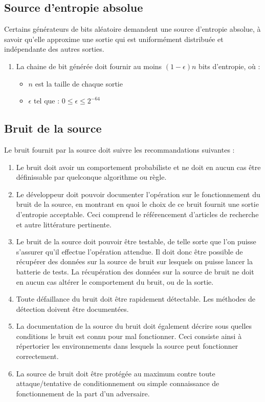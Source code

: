 \subsection{Source d'entropie absolue}
Certains générateurs de bits aléatoire demandent une source d'entropie absolue, à savoir qu'elle approxime une sortie qui est uniformément distribuée et indépendante des autres sorties. 
\begin{enumerate}
\item La chaine de bit générée doit fournir au moins $(1-\epsilon)n$ bits d'entropie, où : 
	\begin{itemize}
	\item $n$ est la taille de chaque sortie
	\item $\epsilon$ tel que : $0\leqslant \epsilon \leqslant 2^{-64}$
	\end{itemize}
\end{enumerate}

\subsection{Bruit de la source}
Le bruit fournit par la source doit suivre les recommandations suivantes :
\begin{enumerate}
\item Le bruit doit avoir un comportement probabiliste et ne doit en aucun cas être définissable par quelconque algorithme ou règle.
\item Le développeur doit pouvoir documenter l'opération sur le fonctionnement du bruit de la source, en montrant en quoi le choix de ce bruit fournit une sortie d'entropie acceptable. Ceci comprend le référencement d'articles de recherche et autre littérature pertinente.
\item Le bruit de la source doit pouvoir être testable, de telle sorte que l'on puisse s'assurer qu'il effectue l'opération attendue. Il doit donc être possible de récupérer des données sur la source de bruit sur lesquels on puisse lancer la batterie de tests. La récupération des données sur la source de bruit ne doit en aucun cas altérer le comportement du bruit, ou de la sortie.
\item Toute défaillance du bruit doit être rapidement détectable. Les méthodes de détection doivent être documentées.
\item La documentation de la source du bruit doit également décrire sous quelles conditions le bruit est connu pour mal fonctionner. Ceci consiste ainsi à répertorier les environnements dans lesquels la source peut fonctionner correctement. 
\item La source de bruit doit être protégée au maximum contre toute attaque/tentative de conditionnement ou simple connaissance de fonctionnement de la part d'un adversaire. 
\end{enumerate}

